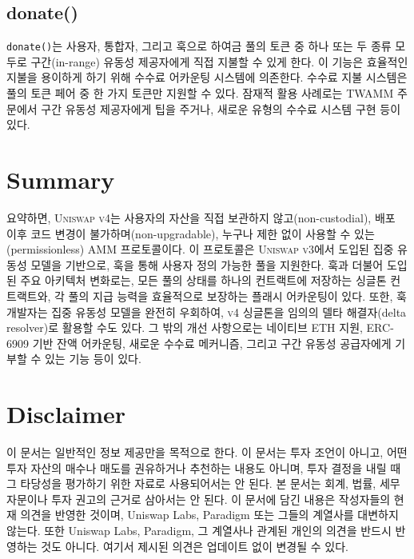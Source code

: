 \documentclass[sigconf,nonacm,prologue,table]{acmart}
\numberwithin{equation}{section}
\theoremstyle{definition}
\theoremstyle{remark}
\begin{document}
\subsection{donate()}
\verb|donate()|는 사용자, 통합자, 그리고 훅으로 하여금 풀의 토큰 중 하나 또는 두 종류 모두로 구간(in-range) 유동성 제공자에게 직접 지불할 수 있게 한다. 이 기능은 효율적인 지불을 용이하게 하기 위해 수수료 어카운팅 시스템에 의존한다. 수수료 지불 시스템은 풀의 토큰 페어 중 한 가지 토큰만 지원할 수 있다. 잠재적 활용 사례로는 TWAMM 주문에서 구간 유동성 제공자에게 팁을 주거나, 새로운 유형의 수수료 시스템 구현 등이 있다.

\section{Summary}
요약하면, \textsc{Uniswap v4}는 사용자의 자산을 직접 보관하지 않고(non-custodial), 배포 이후 코드 변경이 불가하며(non-upgradable), 누구나 제한 없이 사용할 수 있는(permissionless) AMM 프로토콜이다. 이 프로토콜은 \textsc{Uniswap v3}에서 도입된 집중 유동성 모델을 기반으로, 훅을 통해 사용자 정의 가능한 풀을 지원한다. 훅과 더불어 도입된 주요 아키텍처 변화로는, 모든 풀의 상태를 하나의 컨트랙트에 저장하는 싱글톤 컨트랙트와, 각 풀의 지급 능력을 효율적으로 보장하는 플래시 어카운팅이 있다. 또한, 훅 개발자는 집중 유동성 모델을 완전히 우회하여, \textsc{v4} 싱글톤을 임의의 델타 해결자(delta resolver)로 활용할 수도 있다. 그 밖의 개선 사항으로는 네이티브 ETH 지원, ERC-6909 기반 잔액 어카운팅, 새로운 수수료 메커니즘, 그리고 구간 유동성 공급자에게 기부할 수 있는 기능 등이 있다.




\section*{Disclaimer}

이 문서는 일반적인 정보 제공만을 목적으로 한다. 이 문서는 투자 조언이 아니고, 어떤 투자 자산의 매수나 매도를 권유하거나 추천하는 내용도 아니며, 투자 결정을 내릴 때 그 타당성을 평가하기 위한 자료로 사용되어서는 안 된다. 본 문서는 회계, 법률, 세무 자문이나 투자 권고의 근거로 삼아서는 안 된다. 이 문서에 담긴 내용은 작성자들의 현재 의견을 반영한 것이며, Uniswap Labs, Paradigm 또는 그들의 계열사를 대변하지 않는다. 또한 Uniswap Labs, Paradigm, 그 계열사나 관계된 개인의 의견을 반드시 반영하는 것도 아니다. 여기서 제시된 의견은 업데이트 없이 변경될 수 있다.
\end{document}
